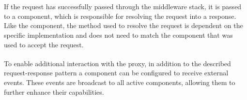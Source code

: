 \\\\
If the request has successfully passed through the middleware stack, it is passed to a  component, which is responsible for resolving the request into a response. Like the  component, the method used to resolve the request is dependent on the specific implementation and does not need to match the  component that was used to accept the request.
\\\\
To enable additional interaction with the proxy, in addition to the described request-response pattern a  component can be configured to receive external events. These events are broadcast to all active components, allowing them to further enhance their capabilities.
\\\\

